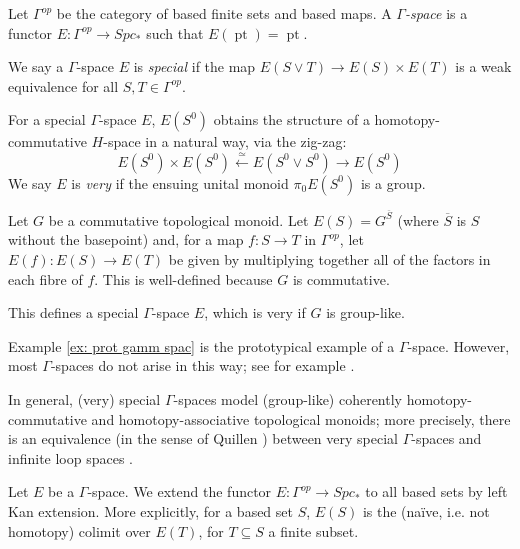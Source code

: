 \documentclass{TPmod}
\newcommand{\pt}{\operatorname{pt}}
\numberwithin{equation}{section}
\begin{document}
    \begin{defn}
        Let $\Gamma^{op}$ be the category of based finite sets and based maps. A \emph{$\Gamma$-space} is a functor $E: \Gamma^{op} \to Spc_*$ such that $E(\pt) = \pt$.

        We say a $\Gamma$-space $E$ is \emph{special} if the map $E(S \vee T) \to E(S) \times E(T)$ is a weak equivalence for all $S, T \in \Gamma^{op}$.

        For a special $\Gamma$-space $E$, $E(S^0)$ obtains the structure of a homotopy-commutative $H$-space in a natural way, via the zig-zag:
        \begin{equation}
            E(S^0) \times E(S^0) \xleftarrow{\simeq} E(S^0 \vee S^0) \to E(S^0)
        \end{equation}
        We say $E$ is \emph{very} if the ensuing unital monoid $\pi_0 E(S^0)$ is a group.
    \end{defn}
    \begin{ex}\label{ex: prot gamm spac}
        Let $G$ be a commutative topological monoid. Let $E(S) = G^{\overline S}$ (where $\overline S$ is $S$ without the basepoint) and, for a map $f: S \to T$ in $\Gamma^{op}$, let $E(f): E(S) \to E(T)$ be given by multiplying together all of the factors in each fibre of $f$. This is well-defined because $G$ is commutative. 

        This defines a special $\Gamma$-space $E$, which is very if $G$ is group-like.

    \end{ex}
    \begin{rmk}
        Example \ref{ex: prot gamm spac} is the prototypical example of a $\Gamma$-space. However, most $\Gamma$-spaces do not arise in this way; see for example \cite[Corollary 4K.7]{Hatcher:book}.
        
        In general, (very) special $\Gamma$-spaces model (group-like) coherently homotopy-commutative and homotopy-associative topological monoids; more precisely, there is an equivalence (in the sense of Quillen \cite{Quillen:book}) between very special $\Gamma$-spaces and infinite loop spaces \cite[Theorem 5.8]{Bousfield-Friedlander}.
    \end{rmk}

    Let $E$ be a $\Gamma$-space. We extend the functor $E: \Gamma^{op} \to Spc_*$ to all based sets by left Kan extension. More explicitly, for a based set $S$, $E(S)$ is the (na\"ive, i.e. not homotopy) colimit over $E(T)$, for $T \subseteq S$ a finite subset. 
\end{document}
